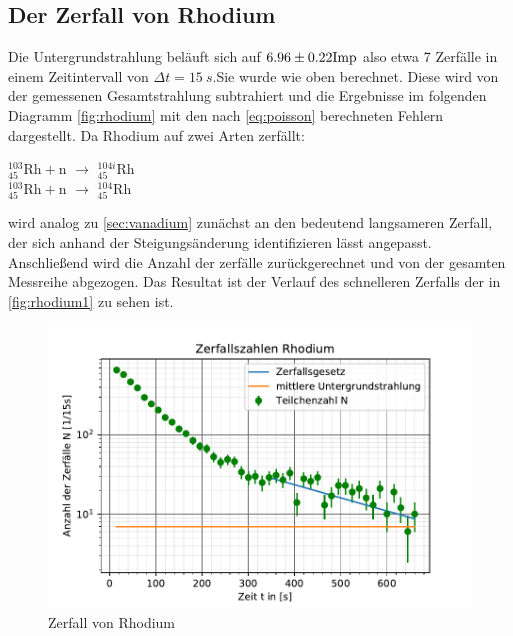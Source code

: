 \subsection{Der Zerfall von Rhodium}
Die Untergrundstrahlung beläuft sich auf  $6.96 \pm 0.22 \si[]{\mathrm{Imp}}$ also etwa 7 Zerfälle in einem Zeitintervall
von $\Delta t =\SI{15}{s}$.Sie wurde wie oben berechnet. Diese wird von der gemessenen Gesamtstrahlung subtrahiert und die Ergebnisse
im folgenden Diagramm \autoref{fig:rhodium} mit den nach \autoref{eq:poisson} berechneten Fehlern dargestellt.
Da Rhodium auf zwei Arten zerfällt: 
\begin{center} 
    $^{103}_{45}\mathrm{Rh} + \mathrm{n}$ $\rightarrow$ $^{104i}_{45}\mathrm{Rh}$\\
    $^{103}_{45}\mathrm{Rh} + \mathrm{n}$ $\rightarrow$ $^{104}_{45}\mathrm{Rh}$
\end{center}
wird analog zu \autoref{sec:vanadium} zunächst an den bedeutend langsameren Zerfall, der sich anhand der 
Steigungsänderung identifizieren lässt angepasst. Anschließend wird die Anzahl der zerfälle zurückgerechnet und 
von der gesamten Messreihe abgezogen. Das Resultat ist der Verlauf des schnelleren Zerfalls der in 
\autoref{fig:rhodium1} zu sehen ist. 
  \begin{figure}
    
    \centering
    \includegraphics{rhodium.pdf}
    \caption{Zerfall von Rhodium}
    \label{fig:rhodium}
  \end{figure}

